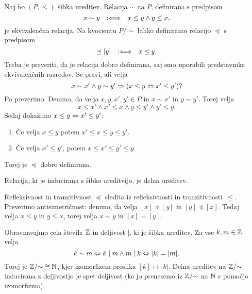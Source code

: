 Naj bo $(P, \leq)$ šibka ureditev. Relacija $\sim$ na $P$, definirana s predpisom
%
\begin{equation*}
  x \sim y \quad {{:}{\Longleftrightarrow}}\quad x \leq y \land y \leq x,
\end{equation*}
%
je ekvivalenčna relacija. Na kvocientu $P/{\sim}$ lahko definiramo relacijo $\preceq$ s
predpisom
%
\begin{equation*}
  [x] \preceq [y] \defiff x \leq y.
\end{equation*}
%
Treba je preveriti, da je relacija dobro definirana, saj smo uporabili predstavnike ekvivalenčnih razredov. Se pravi, ali velja
\begin{equation*}
  x \sim x' \land y \sim y' \Rightarrow (x \leq y \Leftrightarrow x' \leq y') ?
\end{equation*}
%
Pa preverimo. Denimo, da velja $x, y, x', y' \in P$ in $x \sim x'$ in $y \sim y'$.
Torej velja
\begin{equation*}
  x \leq x' \land x' \leq x \land y \leq y' \land y' \leq y.
\end{equation*}
%
Sedaj dokažimo $x \leq y \Leftrightarrow x' \leq y'$:
%
\begin{enumerate}
\item Če velja $x \leq y$ potem $x' \leq x \leq y \leq y'$.
\item Če velja $x' \leq y'$, potem $x \leq x' \leq y' \leq y$.
\end{enumerate}
%
Torej je $\preceq$ dobro definirana.

\begin{izjava}
  Relacija, ki je inducirana s šibko ureditvijo, je delna ureditev.
\end{izjava}

\begin{dokaz}
  Refleksivnost in tranzitivnost $\preceq$ sledita iz refleksivnosti in tranzitivnosti~$\leq$. Preverimo antisimetričnost: denimo, da velja $[x] \preceq [y]$ in $[y] \preceq [x]$. Tedaj velja $x \leq y$ in $y \leq x$, torej velja $x \sim y$ in $[x] = [y]$.
\end{dokaz}

\begin{primer}
  Obravnavajmo cela števila $\mathbb{Z}$ in deljivost $\mid$, ki je šibka
  ureditev. Za vse $k, m \in \mathbb{Z}$ velja
  \begin{equation*}
    k \sim m \Leftrightarrow k \mid m \land m \mid k \Leftrightarrow |k| = |m|.
  \end{equation*}
  Torej je $\mathbb{Z}/{\sim} \cong \mathbb{N}$, kjer izomorfizem preslika $[k] \mapsto |k|$. Delna ureditev na $\mathbb{Z}/{\sim}$ inducirana z deljivostjo je spet deljivost (ko jo prenesemo iz $\mathbb{Z}/{\sim}$ na $\mathbb{N}$ s pomočjo izomorfizma).
\end{primer}


